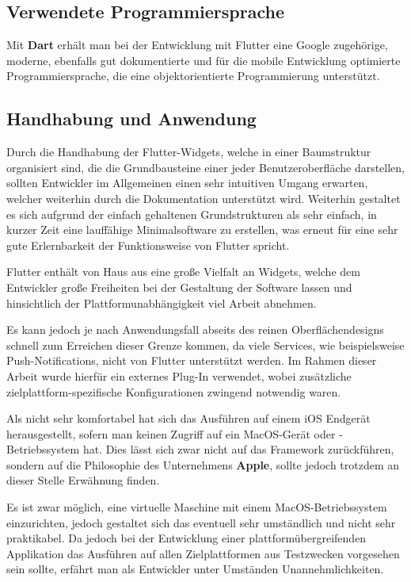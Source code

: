 \documentclass[bibliography=totoc,listof=totoc,BCOR=5mm,DIV=12,oneside]{scrbook}
\begin{document}
{\subsection{Verwendete Programmiersprache}
\par Mit \textbf{Dart}\citep{DartLangHomepage} erhält man bei der Entwicklung mit Flutter eine Google zugehörige, moderne, ebenfalls gut dokumentierte und für die mobile Entwicklung optimierte Programmiersprache, die eine objektorientierte Programmierung unterstützt. 

\subsection{Handhabung und Anwendung}
\label{sub:handhabungFLutter}
\par Durch die Handhabung der Flutter-Widgets, welche in einer Baumstruktur organisiert sind, die die Grundbausteine einer jeder Benutzeroberfläche darstellen, sollten Entwickler im Allgemeinen einen sehr intuitiven Umgang erwarten, welcher weiterhin durch die Dokumentation unterstützt wird. Weiterhin gestaltet es sich aufgrund der einfach gehaltenen Grundstrukturen als sehr einfach, in kurzer Zeit eine lauffähige Minimalsoftware zu erstellen, was erneut für eine sehr gute Erlernbarkeit der Funktionsweise von Flutter spricht.

\par \bigskip Flutter enthält von Haus aus eine große Vielfalt an Widgets, welche dem Entwickler große Freiheiten bei der Gestaltung der Software lassen und  hinsichtlich der Plattformunabhängigkeit viel Arbeit abnehmen.

\par \bigskip Es kann jedoch je nach Anwendungsfall abseits des reinen Oberflächendesigns schnell zum Erreichen dieser Grenze kommen, da viele Services, wie beispielsweise Push-Notifications, nicht von Flutter unterstützt werden. Im Rahmen dieser Arbeit wurde hierfür ein externes Plug-In verwendet, wobei zusätzliche zielplattform-spezifische Konfigurationen zwingend notwendig waren.

\par \bigskip Als nicht sehr komfortabel hat sich das Ausführen auf einem iOS Endgerät herausgestellt, sofern man keinen Zugriff auf ein MacOS-Gerät oder -Betriebssystem hat. Dies lässt sich zwar nicht auf das Framework zurückführen, sondern auf die Philosophie des Unternehmens \textbf{Apple}, sollte jedoch trotzdem an dieser Stelle Erwähnung finden. 
\par \bigskip Es ist zwar möglich, eine virtuelle Maschine mit einem MacOS-Betriebssystem einzurichten, jedoch gestaltet sich das eventuell sehr umständlich und nicht sehr praktikabel. Da jedoch bei der Entwicklung einer plattformübergreifenden Applikation das Ausführen auf allen Zielplattformen aus Testzwecken vorgesehen sein sollte, erfährt man als Entwickler unter Umständen Unannehmlichkeiten.

}
\end{document}

